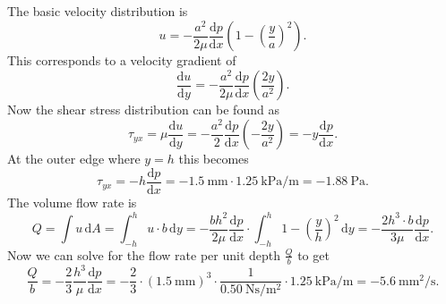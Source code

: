 \begin{derivation}
  The basic velocity distribution is
  \[ 
  u = - \frac{a^2}{2\mu} \frac{\mathrm{d}p}{\mathrm{d}x} \left( 1 - \left( \frac{y}{a} \right)^2 \right)
  .\]
  This corresponds to a velocity gradient of
  \[ 
  \frac{\mathrm{d}u}{\mathrm{d}y} = - \frac{a^2}{2\mu} \frac{\mathrm{d}p}{\mathrm{d}x} \left( \frac{2y}{a^2} \right)
  .\]
  Now the shear stress distribution can be found as
  \[ 
  \tau_{yx} = \mu \frac{\mathrm{d}u}{\mathrm{d}y} = - \frac{a^2}{2} \frac{\mathrm{d}p}{\mathrm{d}x} \left( - \frac{2y}{a^2} \right) = -y \frac{\mathrm{d}p}{\mathrm{d}x} 
  .\]
  At the outer edge where $y = h$ this becomes
  \[ 
  \tau_{yx} = -h \frac{\mathrm{d}p}{\mathrm{d}x} = -\qty{1,5}{\mm} \cdot \qty{1,25}{\kPa\per\m} = \qty{-1,88}{\Pa}
  .\]
  The volume flow rate is
  \[ 
  Q = \int u \, \mathrm{d}A = \int_{-h}^{h} u \cdot b \, \mathrm{d}y = -\frac{b h^2}{2\mu} \frac{\mathrm{d}p}{\mathrm{d}x} \cdot \int_{-h}^{h} 1 - \left( \frac{y}{h} \right)^2 \, \mathrm{d}y  = - \frac{2 h^3 \cdot b}{3\mu} \frac{\mathrm{d}p}{\mathrm{d}x} 
  .\] 
  Now we can solve for the flow rate per unit depth $\frac{Q}{b}$ to get
  \[ 
  \frac{Q}{b} = - \frac{2}{3} \frac{h^3}{\mu} \frac{\mathrm{d}p}{\mathrm{d}x} = - \frac{2}{3} \cdot \left( \qty{1,5}{\mm}  \right)^3 \cdot \frac{1}{\qty{0,50}{\N\s\per\square\m}} \cdot \qty{1,25}{\kPa\per\m} = \qty{-5,6}{\square\mm\per\s} 
  .\]
\end{derivation}

